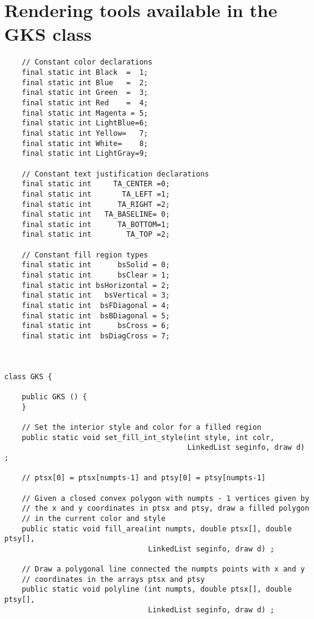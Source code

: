 \documentclass[12pt]{article}
\begin{document}
\section{Rendering tools available in the GKS class}

\begin{verbatim}
    // Constant color declarations
    final static int Black  =  1;
    final static int Blue   =  2;
    final static int Green  =  3;
    final static int Red    =  4;
    final static int Magenta = 5;
    final static int LightBlue=6;
    final static int Yellow=   7;
    final static int White=    8;
    final static int LightGray=9;

    // Constant text justification declarations
    final static int     TA_CENTER =0;
    final static int       TA_LEFT =1;
    final static int      TA_RIGHT =2;
    final static int   TA_BASELINE= 0;
    final static int      TA_BOTTOM=1;
    final static int        TA_TOP =2;
                                      
    // Constant fill region types
    final static int      bsSolid = 0;
    final static int      bsClear = 1;
    final static int bsHorizontal = 2;
    final static int   bsVertical = 3;
    final static int  bsFDiagonal = 4;
    final static int  bsBDiagonal = 5;
    final static int      bsCross = 6;
    final static int  bsDiagCross = 7;



class GKS {

    public GKS () {
    }

    // Set the interior style and color for a filled region
    public static void set_fill_int_style(int style, int colr, 
                                          LinkedList seginfo, draw d) ;

    // ptsx[0] = ptsx[numpts-1] and ptsy[0] = ptsy[numpts-1]

    // Given a closed convex polygon with numpts - 1 vertices given by
    // the x and y coordinates in ptsx and ptsy, draw a filled polygon
    // in the current color and style
    public static void fill_area(int numpts, double ptsx[], double ptsy[],
                                 LinkedList seginfo, draw d) ;

    // Draw a polygonal line connected the numpts points with x and y
    // coordinates in the arrays ptsx and ptsy
    public static void polyline (int numpts, double ptsx[], double ptsy[],
                                 LinkedList seginfo, draw d) ;
  


\end{verbatim}
\end{document}
